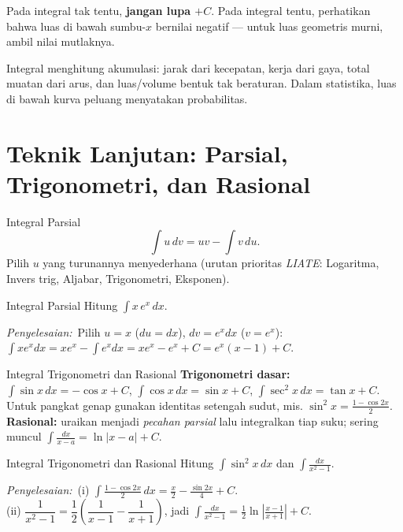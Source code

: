 \documentclass[11pt,a4paper]{report}
\theoremstyle{gaya}
\newcommand{\jawab}{\par\smallskip\noindent\textit{\textcolor{oranye}{Penyelesaian:}}\ }
\begin{document}
\begin{kesalahan}
Pada integral tak tentu, \textbf{jangan lupa $+C$}. Pada integral tentu, perhatikan bahwa luas di bawah sumbu-$x$ bernilai negatif --- untuk luas geometris murni, ambil nilai mutlaknya.
\end{kesalahan}

\begin{dunianyata}
Integral menghitung akumulasi: jarak dari kecepatan, kerja dari gaya, total muatan dari arus, dan luas/volume bentuk tak beraturan. Dalam statistika, luas di bawah kurva peluang menyatakan probabilitas.
\end{dunianyata}

\section{Teknik Lanjutan: Parsial, Trigonometri, dan Rasional}
\begin{konsep}{Integral Parsial}
\[
\int u\,dv = uv-\int v\,du.
\]
Pilih $u$ yang turunannya menyederhana (urutan prioritas \emph{LIATE}: Logaritma, Invers trig, Aljabar, Trigonometri, Eksponen).
\end{konsep}

\begin{contoh}{Integral Parsial}
Hitung $\displaystyle\int x\,e^{x}\,dx$.

\jawab Pilih $u=x$ ($du=dx$), $dv=e^x dx$ ($v=e^x$): $\displaystyle\int x e^x dx=xe^x-\int e^x dx=xe^x-e^x+C=e^x(x-1)+C.$
\end{contoh}

\begin{konsep}{Integral Trigonometri dan Rasional}
\textbf{Trigonometri dasar:} $\int\sin x\,dx=-\cos x+C$, $\int\cos x\,dx=\sin x+C$, $\int\sec^2x\,dx=\tan x+C$. Untuk pangkat genap gunakan identitas setengah sudut, mis. $\sin^2x=\tfrac{1-\cos2x}{2}$.\\
\textbf{Rasional:} uraikan menjadi \emph{pecahan parsial} lalu integralkan tiap suku; sering muncul $\int\tfrac{dx}{x-a}=\ln|x-a|+C$.
\end{konsep}

\begin{contoh}{Integral Trigonometri dan Rasional}
Hitung $\displaystyle\int\sin^2x\,dx$ dan $\displaystyle\int\frac{dx}{x^2-1}$.

\jawab (i) $\displaystyle\int\frac{1-\cos2x}{2}\,dx=\frac x2-\frac{\sin2x}{4}+C$.\\
(ii) $\dfrac{1}{x^2-1}=\dfrac12\!\left(\dfrac{1}{x-1}-\dfrac{1}{x+1}\right)$, jadi $\displaystyle\int\frac{dx}{x^2-1}=\frac12\ln\left|\frac{x-1}{x+1}\right|+C$.
\end{contoh}
\end{document}
